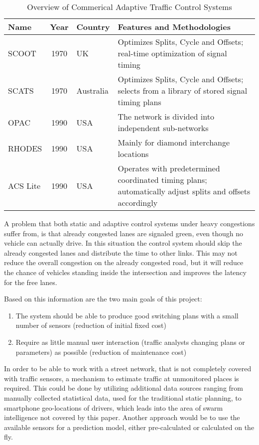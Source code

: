 \begin{table}[ht!]
	\centering
	\begin{tabular}{l|cl|p{9cm}}
		Name & Year & Country & Features and Methodologies \\
		\hline\hline
		SCOOT & 1970 & UK & Optimizes Splits, Cycle and Offsets; real-time optimization of signal timing \\
		\hline
		SCATS & 1970 & Australia & Optimizes Splits, Cycle and Offsets; selects from a library of stored signal timing plans \\
		\hline
		OPAC & 1990 & USA & The network is divided into independent sub-networks \\
		\hline
		RHODES & 1990 & USA & Mainly for diamond interchange locations \\
		\hline
		ACS Lite & 1990 & USA & Operates with predetermined coordinated timing plans; automatically adjust splits and offsets accordingly \\
	\end{tabular}
	\caption{Overview of Commerical Adaptive Traffic Control Systems}
	\label{atcs_overview}
\end{table}

A problem that both static and adaptive control systems under heavy congestions suffer from, is that already congested lanes are signaled green, even though no vehicle can actually drive. In this situation the control system should skip the already congested lanes and distribute the time to other links. This may not reduce the overall congestion on the already congested road, but it will reduce the chance of vehicles standing inside the intersection and improves the latency for the free lanes.

Based on this information are the two main goals of this project:

\begin{enumerate}
	\item The system should be able to produce good switching plans with a small number of sensors (reduction of initial fixed cost)
	\item Require as little manual user interaction (traffic analysts changing plans or parameters) as possible (reduction of maintenance cost)
\end{enumerate}

In order to be able to work with a street network, that is not completely covered with traffic sensors, a mechanism to estimate traffic at unmonitored places is required. This could be done by utilizing additional data sources ranging from manually collected statistical data, used for the traditional static planning, to smartphone geo-locations of drivers, which leads into the area of swarm intelligence not covered by this paper. Another approach would be to use the available sensors for a prediction model, either pre-calculated or calculated on the fly.

